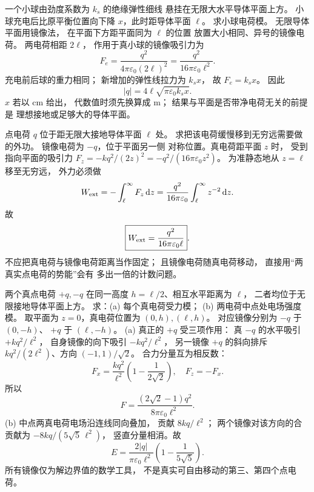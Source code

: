 
一个小球由劲度系数为 $k_s$ 的绝缘弹性细线
悬挂在无限大水平导体平面上方。
小球充电后比原平衡位置向下降
$x$，此时距导体平面 $\ell$。
求小球电荷模。
\exsolution
无限导体平面用镜像法，
在平面下方距平面同为 $\ell$ 的位置
放置大小相同、异号的镜像电荷。
两电荷相距 $2\ell$，
作用于真小球的镜像吸引力为
\[
F_e=\frac{q^2}{4\pi\varepsilon_0(2\ell)^2}
=\frac{q^2}{16\pi\varepsilon_0\ell^2}.
\]
充电前后球的重力相同；
新增加的弹性线拉力为 $k_sx$，
故 $F_e=k_sx$。
因此
\[
\boxed{|q|=4\ell\sqrt{\pi\varepsilon_0k_sx}}.
\]
\excheck $x$ 若以 cm 给出，
代数值时须先换算成 m；
结果与平面是否带净电荷无关的前提是
理想接地或足够大的导体平面。

点电荷 $q$ 位于距无限大接地导体平面
$\ell$ 处。
求把该电荷缓慢移到无穷远需要做的外功。
\exsolution
镜像电荷为 $-q$，位于平面另一侧
对称位置。真电荷距平面 $z$ 时，
受到指向平面的吸引力
$F_z=-kq^2/(2z)^2=-q^2/(16\pi\varepsilon_0z^2)$。
为准静态地从 $z=\ell$ 移至无穷远，
外力必须做
\[
W_{\rm ext}=-\int_\ell^\infty F_z\,\mathrm dz
=\frac{q^2}{16\pi\varepsilon_0}
\int_\ell^\infty z^{-2}\,\mathrm dz.
\]
故
\[
\boxed{W_{\rm ext}=\frac{q^2}{16\pi\varepsilon_0\ell}}.
\]
\excheck 不应把真电荷与镜像电荷距离当作固定；
且镜像电荷随真电荷移动，
直接用“两真实点电荷的势能”会有
多出一倍的计数问题。

两个真点电荷 $+q,-q$ 在同一高度
$h=\ell/2$、相互水平距离为 $\ell$，
二者均位于无限接地导体平面上方。
求：(a) 每个真电荷受力模；
(b) 两电荷中点处电场强度模。
\exsolution
取平面为 $z=0$，真电荷位置为
$(0,h),(\ell,h)$。
对应镜像分别为 $-q$ 于 $(0,-h)$、
$+q$ 于 $(\ell,-h)$。
(a) 真正的 $+q$ 受三项作用：
真 $-q$ 的水平吸引
$+kq^2/\ell^2$，
自身镜像的向下吸引
$-kq^2/\ell^2$，
另一镜像 $+q$ 的斜向排斥
$kq^2/(2\ell^2)$、方向 $(-1,1)/\sqrt2$。
合力分量互为相反数：
\[
F_x=\frac{kq^2}{\ell^2}
\left(1-\frac{1}{2\sqrt2}\right),\quad F_z=-F_x.
\]
所以
\[
\boxed{F=\frac{(2\sqrt2-1)q^2}
{8\pi\varepsilon_0\ell^2}}.
\]
(b) 中点两真电荷电场沿连线同向叠加，
贡献 $8kq/\ell^2$；
两个镜像对该方向的合贡献为
$-8kq/(5\sqrt5\,\ell^2)$，
竖直分量相消。故
\[
\boxed{E=
\frac{2|q|}{\pi\varepsilon_0\ell^2}
\left(1-\frac1{5\sqrt5}\right)}.
\]
\excheck 所有镜像仅为解边界值的数学工具，
不是真实可自由移动的第三、第四个点电荷。

